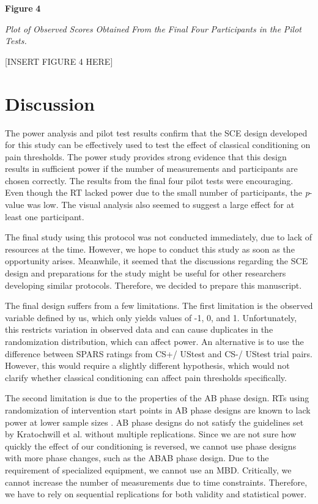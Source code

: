 \documentclass{article}
\begin{document}
\textbf{Figure }\textbf{4}

\emph{Plot of }\emph{Observed Score}\emph{s }\emph{O}\emph{btained }\emph{F}\emph{rom}\emph{ the }\emph{F}\emph{inal }\emph{F}\emph{our }\emph{P}\emph{articipants in the }\emph{P}\emph{ilot }\emph{T}\emph{ests.}

[INSERT FIGURE 4 HERE]

\section{Discussion}

The power analysis and pilot test results confirm that the SCE design developed for this study can be effectively used to test the effect of classical conditioning on pain thresholds. The power study provides strong evidence that this design results in sufficient power if the number of measurements and participants are chosen correctly. The results from the final four pilot tests were encouraging. Even though the RT lacked power due to the small number of participants, the \emph{p}-value was low. The visual analysis also seemed to suggest a large effect for at least one participant. 

The final study using this protocol was not conducted immediately, due to lack of resources at the time. However, we hope to conduct this study as soon as the opportunity arises. Meanwhile, it seemed that the discussions regarding the SCE design and preparations for the study might be useful for other researchers developing similar protocols. Therefore, we decided to prepare this manuscript.

The final design suffers from a few limitations. The first limitation is the observed variable defined by us, which only yields values of -1, 0, and 1. Unfortunately, this restricts variation in observed data and can cause duplicates in the randomization distribution, which can affect power. An alternative is to use the difference between SPARS ratings from CS+/ UStest and CS-/ UStest trial pairs. However, this would require a slightly different hypothesis, which would not clarify whether classical conditioning can affect pain thresholds specifically.

The second limitation is due to the properties of the AB phase design. RTs using randomization of intervention start points in AB phase designs are known to lack power at lower sample sizes \autocite{bib76}. AB phase designs do not satisfy the guidelines set by Kratochwill et al. \autocite{bib77} without multiple replications. Since we are not sure how quickly the effect of our conditioning is reversed, we cannot use phase designs with more phase changes, such as the ABAB phase design. Due to the requirement of specialized equipment, we cannot use an MBD. Critically, we cannot increase the number of measurements due to time constraints. Therefore, we have to rely on sequential replications for both validity and statistical power. 
\end{document}
